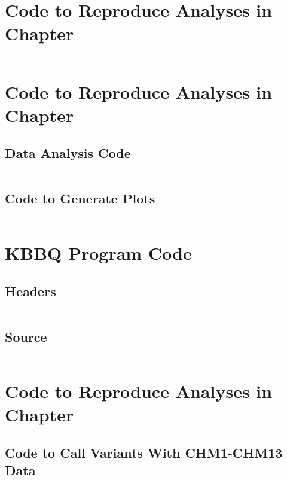 \chapter{Code to Reproduce Analyses in Chapter \protect\structuredref{}}
\label{ch:structured_code}
\newpage
\inputminted[breaklines, breakanywhere, tabsize=2]{Makefile}{ch3/scripts/ch3_makefiles.txt}

\chapter{Code to Reproduce Analyses in Chapter \protect\kbbqref{}}
\label{ch:kbbq_plot_code}
\newpage
\section{Data Analysis Code}
\inputminted[breaklines, breakanywhere, tabsize=2]{Makefile}{ch4/scripts/ch4_makefiles.txt}
\section{Code to Generate Plots}
\inputminted[breaklines, breakanywhere, tabsize=2]{r}{ch4/scripts/plot_benchmarks.R}

\chapter{KBBQ Program Code}
\label{ch:kbbq_code}
\newpage
\section{Headers}
\inputminted[breaklines, breakanywhere, tabsize=2]{cpp}{ch4/scripts/kbbq_include.hh}
\section{Source}
\inputminted[breaklines, breakanywhere, tabsize=2]{cpp}{ch4/scripts/kbbq_src.cc}

\chapter{Code to Reproduce Analyses in Chapter \protect\evaluatingref{}}
\label{ch:evaluating_code}
\newpage
\section{Code to Call Variants With CHM1-CHM13 Data}
\inputminted[breaklines, breakanywhere, tabsize=2]{Makefile}{ch5/scripts/chm1-chm13_variants_makefiles.txt}
